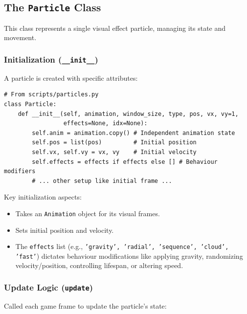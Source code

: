 \documentclass[11pt, a4paper]{article}
\begin{document}
\subsection{The \texttt{Particle} Class}

This class represents a single visual effect particle, managing its state and movement.

\subsubsection{Initialization (\texttt{\_\_init\_\_})}

A particle is created with specific attributes:

\begin{lstlisting}[caption={Particle Class \_\_init\_\_ Snippet}, label={lst:particle_init_short}]
# From scripts/particles.py
class Particle:
    def __init__(self, animation, window_size, type, pos, vx, vy=1, 
                 effects=None, idx=None):
        self.anim = animation.copy() # Independent animation state
        self.pos = list(pos)         # Initial position
        self.vx, self.vy = vx, vy    # Initial velocity
        self.effects = effects if effects else [] # Behaviour modifiers
        # ... other setup like initial frame ...
\end{lstlisting}

Key initialization aspects:

\begin{itemize}

    \item Takes an \texttt{Animation} object for its visual frames.
    
    \item Sets initial position and velocity.
    
    \item The \texttt{effects} list (e.g., \texttt{'gravity', 'radial', 'sequence', 'cloud', 'fast'}) dictates behaviour modifications like applying gravity, randomizing velocity/position, controlling lifespan, or altering speed.

\end{itemize}

\subsubsection{Update Logic (\texttt{update})}

Called each game frame to update the particle's state:
\end{document}
